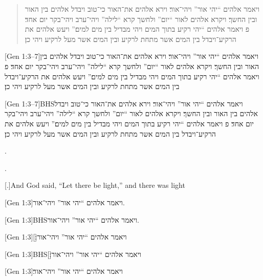\documentclass[12pt]{article}
\begin{document}
\hyphenblockcquote{hebrew}[Gen 1:3–7]{BHS}{ויאמר אלהים \enquote{יהי אור}
ויהי־אור׃ וירא אלהים את־האור כי־טוב ויבדל אלהים בין האור ובין החשך׃ ויקרא
אלהים לאור \enquote{יום} ולחשך קרא \enquote{לילה} ויהי־ערב ויהי־בקר יום אחד׃ פ
ויאמר אלהים \enquote{יהי רקיע בתוך המים ויהי מבדיל בין מים למים׃} ויעש אלהים
את הרקיע־ויבדל בין המים אשר מתחת לרקיע ובין המים אשר מעל לרקיע ויהי כן׃}

[Gen 1:3–7]{ויאמר אלהים \enquote{יהי אור} ויהי־אור׃
וירא אלהים את־האור כי־טוב ויבדל אלהים בין האור ובין החשך׃ ויקרא אלהים לאור
\enquote{יום} ולחשך קרא \enquote{לילה} ויהי־ערב ויהי־בקר יום אחד׃ פ ויאמר
אלהים \enquote{יהי רקיע בתוך המים ויהי מבדיל בין מים למים׃} ויעש אלהים את
הרקיע־ויבדל בין המים אשר מתחת לרקיע ובין המים אשר מעל לרקיע ויהי כן׃}

[Gen 1:3–7]{BHS}{ויאמר אלהים \enquote{יהי אור}
ויהי־אור׃ וירא אלהים את־האור כי־טוב ויבדל אלהים בין האור ובין החשך׃ ויקרא
אלהים לאור \enquote{יום} ולחשך קרא \enquote{לילה} ויהי־ערב ויהי־בקר יום אחד׃ פ
ויאמר אלהים \enquote{יהי רקיע בתוך המים ויהי מבדיל בין מים למים׃} ויעש אלהים
את הרקיע־ויבדל בין המים אשר מתחת לרקיע ובין המים אשר מעל לרקיע ויהי כן׃}

.

.


[.]{And God said, \enquote{Let there be light,} and
there was light}



[Gen 1:3]{ויאמר אלהים \enquote{יהי אור} ויהי־אור}.

[Gen 1:3]{BHS}{ויאמר אלהים \enquote{יהי אור}
ויהי־אור}.

[Gen 1:3][׃]{ויאמר אלהים \enquote{יהי אור} ויהי־אור}

[Gen 1:3]{BHS}[׃]{ויאמר אלהים \enquote{יהי אור}
ויהי־אור}

[Gen 1:3]{ויאמר אלהים \enquote{יהי אור} ויהי־אור׃}
\end{document}
